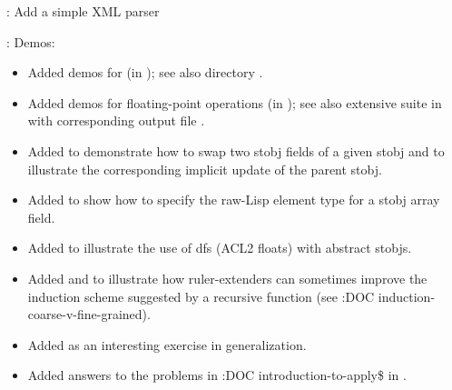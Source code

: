 
\begin{frame}

\newlibtitle

: Add a simple XML parser

\end{frame}


\begin{frame}

\implibtitle

:
Demos:
\begin{itemize}
\item Added demos for  (in
      );
      see also directory .
\item Added demos for floating-point operations (in );
      see also extensive suite in 
      with corresponding output file .
\item Added  to demonstrate how
      to swap two stobj fields of a given stobj and to illustrate the
      corresponding implicit update of the parent stobj.
\item Added  to show how to specify
      the raw-Lisp  element type for a stobj array field.
\item Added  to illustrate
      the use of dfs (ACL2 floats) with abstract stobjs.
\item Added  and
       to illustrate how
      ruler-extenders can sometimes improve the induction scheme
      suggested by a recursive function (see :DOC
      induction-coarse-v-fine-grained).
\item Added  as an interesting exercise in
      generalization.
\item Added answers to the problems in :DOC introduction-to-apply\$ in
      .
\end{itemize}

\end{frame}

